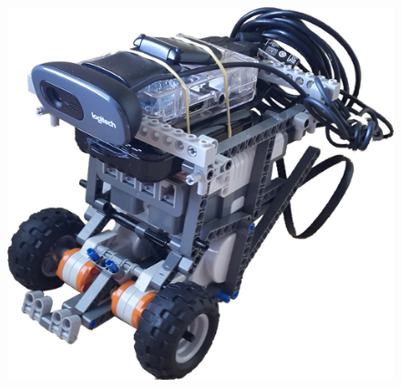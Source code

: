 \documentclass{beamer}
\begin{document}
\begin{frame}
\begin{figure}
\begin{minipage}{0.3\textwidth}
      \includegraphics[width=\linewidth]{imgs/robot.png}
    \end{minipage}
  \end{figure}
\end{frame}
\end{document}

